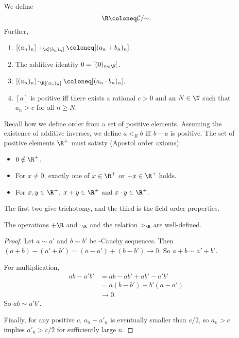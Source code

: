 \begin{definition*}[\R] \label{def:R:cauchy}
    We define \[
        \R \coloneq \mathcal{C} /{\sim}.
    \] Further,
    \begin{enumerate}
        \item $[(a_n)_n] +_\R [(b_n)_n] \coloneq [(a_n + b_n)_n]$.
        \item The additive identity $0 = [(0)_{n \in \N}]$.
        \item $[(a_n)_n] \cdot_\R [(a_n)_n] \coloneq [(a_n \cdot b_n)_n]$.
        \item $[a]$ is positive iff there exists a rational $c > 0$ and an
        $N \in \N$ such that $a_n > c$ for all $n \ge N$.
    \end{enumerate}
\end{definition*}
Recall how we define order from a set of positive elements.
Assuming the existence of additive inverses, we define $a <_R b$ iff
$b - a$ is positive.
The set of positive elements $\R^+$ must satisty (Apostol order axioms):
\begin{itemize}
    \item $0 \notin \R^+$.
    \item For $x \ne 0$, exactly one of $x \in \R^+$ or $-x \in \R^+$ holds.
    \item For $x, y \in \R^+$, $x + y \in \R^+$ and $x \cdot y \in \R^+$.
\end{itemize}
The first two give trichotomy, and the third is the field order properties.
\begin{proposition*}
    The operations $+\R$ and $\cdot_\R$ and the relation $>_\R$ are
    well-defined.
\end{proposition*}
\begin{proof}
    Let $a \sim a'$ and $b \sim b'$ be \Q-Cauchy sequences.
    Then $(a + b) - (a' + b') = (a - a') + (b - b') \to 0$.
    So $a + b \sim a' + b'$.

    For multiplication, \begin{align*}
        a b - a' b' &= a b - a b' + a b' - a' b' \\
        &= a(b - b') + b' (a - a') \\
        &\to 0.
    \end{align*}
    So $a b \sim a' b'$.

    Finally, for any positive $c$, $a_n - a'_n$ is eventually smaller than
    $c/2$, so $a_n > c$ implies $a'_n > c/2$ for sufficiently large $n$.
\end{proof}

